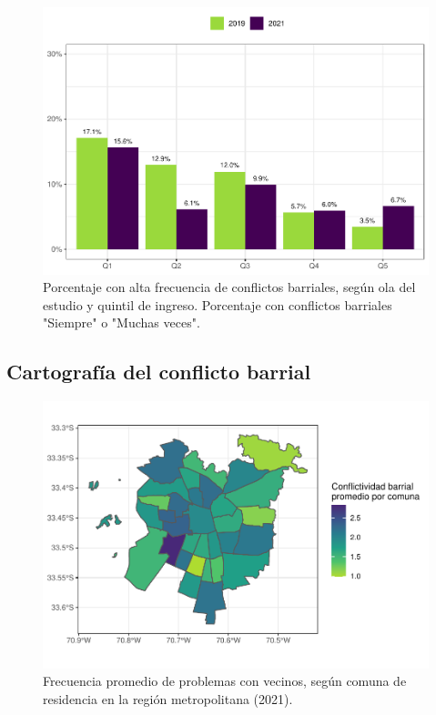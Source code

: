 \documentclass[
  12pt,
  openany]{book}
\begin{document}
\begin{figure}

{\centering \includegraphics{reporte-elsoc_files/figure-latex/confli-quintil-1} 

}

\caption{Porcentaje con alta frecuencia de conflictos barriales, según ola del estudio y quintil de ingreso. Porcentaje con conflictos barriales "Siempre" o "Muchas veces".}\label{fig:confli-quintil}
\end{figure}

\hypertarget{cartografuxeda-del-conflicto-barrial}{%
\subsection{Cartografía del conflicto barrial}\label{cartografuxeda-del-conflicto-barrial}}

\begin{figure}

{\centering \includegraphics{reporte-elsoc_files/figure-latex/confli-comuna-1} 

}

\caption{Frecuencia promedio de problemas con vecinos, según comuna de residencia en la región metropolitana (2021).}\label{fig:confli-comuna}
\end{figure}
\end{document}
